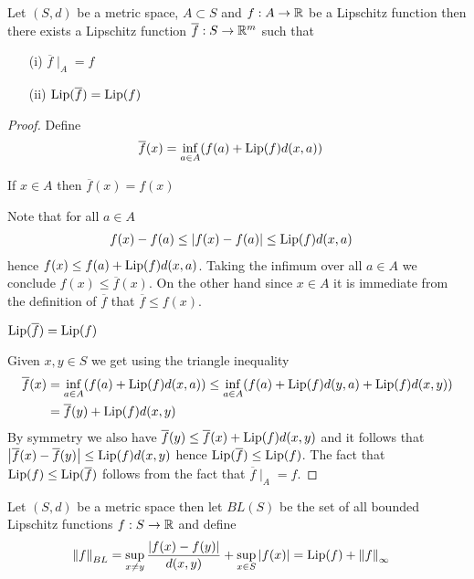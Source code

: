 \begin{lem}\label{ExtensionOfRealValuedLipschitzFunction}Let $(S,d)$  be a metric space, $A \subset S$ and $f : A \to \mathbb{R}$ be a Lipschitz function then there exists a Lipschitz function $\overline{f} : S \to \mathbb{R}^m$ such that
\begin{itemize}
\item[(i)] $\overline{f} \mid_A = f$
\item[(ii)] $\operatorname*{Lip}(\overline{f}) = \operatorname*{Lip}(f)$
\end{itemize}
\end{lem}
\begin{proof}
Define 
\begin{align*}
\overline{f}(x) &= \inf_{a \in A} (f(a) + \operatorname*{Lip}(f) d(x, a))
\end{align*}
\begin{clm} If $x \in A$ then $\overline{f}(x) = f(x)$
\end{clm}
Note that for all $a \in A$
\begin{align*}
f(x) - f(a) &\leq \left \vert f(x) - f(a) \right \vert \leq \operatorname*{Lip}(f) d(x,a)
\end{align*}
hence $f(x) \leq f(a) + \operatorname*{Lip}(f) d(x,a)$.  Taking the infimum over all $a \in A$ we conclude $f(x) \leq \overline{f}(x)$.  On the other hand since $x \in A$ it is immediate from the definition of $\overline{f}$ that $\overline{f} \leq f(x)$.

\begin{clm} $\operatorname*{Lip}(\overline{f}) = \operatorname*{Lip}(f)$
\end{clm}
Given $x,y \in S$ we get using the triangle inequality 
\begin{align*}
\overline{f}(x) &= \inf_{a \in A} (f(a) + \operatorname*{Lip}(f) d(x, a)) \leq \inf_{a \in A} (f(a) + \operatorname*{Lip}(f)d(y, a) + \operatorname*{Lip}(f) d(x, y)) \\
&= \overline{f}(y) + \operatorname*{Lip}(f) d(x, y)
\end{align*}
By symmetry we also have $\overline{f}(y) \leq \overline{f}(x) + \operatorname*{Lip}(f) d(x,y)$ and it follows that $\left \vert \overline{f}(x) -\overline{f}(y) \right \vert \leq \operatorname*{Lip}(f) d(x,y)$ hence $\operatorname*{Lip}(\overline{f}) \leq \operatorname*{Lip}(f)$.  The fact that $\operatorname*{Lip}(f) \leq \operatorname*{Lip}(\overline{f})$ follows from the fact that $\overline{f} \mid_A = f$.
\end{proof}

\begin{defn}Let $(S,d)$ be a metric space then let $BL(S)$ be the set of all bounded Lipschitz functions $f : S \to \mathbb{R}$ and define
\begin{align*}
\left \lVert f \right \rVert_{BL} &= \sup_{x \neq y} \frac{\left \vert f(x)-f(y) \right \vert}{d(x,y)} + \sup_{x \in S} \left \vert f(x) \right \vert = \operatorname*{Lip}(f) + \left \lVert f \right \rVert_\infty
\end{align*}
\end{defn}

